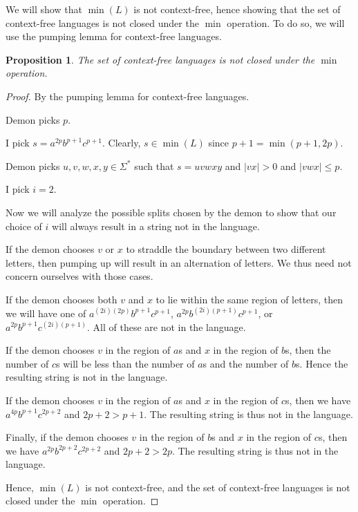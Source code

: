 \documentclass[letterpaper,11pt]{article}
\newtheorem{proposition}{Proposition}
\begin{document}
\begin{enumerate}
        We will show that $\min{(L)}$ is not context-free, hence showing that
        the set of context-free languages is not closed under the $\min$
        operation. To do so, we will use the pumping lemma for context-free
        languages.

        \begin{proposition}
            The set of context-free languages is not closed under the $\min$
            operation.
        \end{proposition}

        \begin{proof}
            By the pumping lemma for context-free languages.

            Demon picks $p$.

            I pick $s = a^{2p} b^{p+1} c^{p+1}$. Clearly, $s \in \min{(L)}$
            since $p+1 = \min{(p+1, 2p)}$.

            Demon picks $u,v,w,x,y \in \Sigma^*$ such that $s = uvwxy$ and
            $|vx| > 0$ and $|vwx| \leq p$.

            I pick $i = 2$.

            Now we will analyze the possible splits chosen by the demon to show
            that our choice of $i$ will always result in a string not in the
            language.

            If the demon chooses $v$ or $x$ to straddle the boundary between
            two different letters, then pumping up will result in an
            alternation of letters. We thus need not concern ourselves with
            those cases.

            If the demon chooses both $v$ and $x$ to lie within the same
            region of letters, then we will have one of
            $a^{(2i)(2p)}b^{p+1}c^{p+1}$, $a^{2p} b^{(2i)(p+1)} c^{p+1}$, or
            $a^{2p} b^{p+1} c^{(2i)(p+1)}$. All of these are not in the
            language.

            If the demon chooses $v$ in the region of $a$s and $x$ in the
            region of $b$s, then the number of $c$s will be less than the
            number of $a$s and the number of $b$s. Hence the resulting string
            is not in the language.

            If the demon chooses $v$ in the region of $a$s and $x$ in the
            region of $c$s, then we have $a^{4p} b^{p+1} c^{2p+2}$ and
            $2p+2 > p + 1$. The resulting string is thus not in the language.

            Finally, if the demon chooses $v$ in the region of $b$s and $x$ in
            the region of $c$s, then we have $a^{2p} b^{2p + 2} c^{2p + 2}$ and
            $2p + 2 > 2p$. The resulting string is thus not in the language.

            Hence, $\min{(L)}$ is not context-free, and the set of context-free
            languages is not closed under the $\min$ operation.
        \end{proof}

\end{enumerate}
\end{document}
